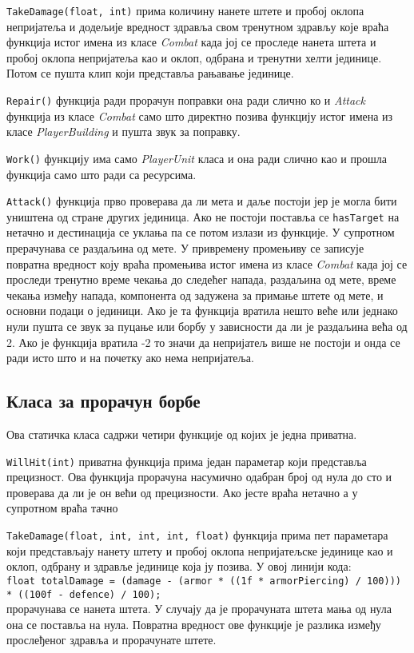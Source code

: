\documentclass[11pt,a4paper]{article}
\begin{document}
\texttt{TakeDamage(float, int)} прима количину нанете штете и пробој оклопа непријатеља и додељије вредност здравља свом тренутном здрављу које враћа функција истог имена из класе \emph{Combat} када јој се проследе нанета штета и пробој оклопа непријатеља као и оклоп, одбрана и тренутни хелти јединице. Потом се пушта клип који представља рањавање јединице.

\texttt{Repair()} функција ради прорачун поправки она ради слично ко и \emph{Attack} функција из класе \emph{Combat} само што директно позива функцију истог имена из класе \emph{PlayerBuilding} и пушта звук за поправку.

\texttt{Work()} функцију има само \emph{PlayerUnit} класа и она ради слично као и прошла функција само што ради са ресурсима.

\texttt{Attack()} функција прво проверава да ли мета и даље постоји јер је могла бити уништена од стране других јединица. Ако не постоји поставља се \texttt{hasTarget} на нетачно и дестинација се уклања па се потом излази из функције. У супротном прерачунава се раздаљина од мете. У привремену промењиву се записује повратна вредност коју враћа промењива истог имена из класе \emph{Combat} када јој се проследи тренутно време чекања до следећег напада, раздаљина од мете, време чекања између напада, компонента од задужена за примање штете од мете, и основни подаци о јединици.  Ако је та функција вратила нешто веће или једнако нули пушта се звук за пуцање или борбу у зависности да ли је раздаљина већа од 2. Ако је функција вратила -2 то значи да непријатељ више не постоји и онда се ради исто што и на почетку ако нема непријатеља.
\newpage
\subsection{Класа за прорачун борбе}
Ова статичка класа садржи четири функције од којих је једна приватна.

\texttt{WillHit(int)} приватна функција прима један параметар који представља прецизност. Ова функција прорачуна насумично одабран број од нула до сто и проверава да ли је он већи од прецизности. Ако јесте враћа нетачно а  у супротном враћа тачно

\texttt{TakeDamage(float, int, int, int, float)} функција прима пет параметара који представљају нанету штету и пробој оклопа непријатељске јединице као и оклоп, одбрану и здравље јединице која ју позива. У овој линији кода:\\ \texttt{float totalDamage = (damage - (armor * ((1f * armorPiercing) / 100))) * ((100f - defence) / 100);} 
\\ прорачунава се нанета штета. У случају да је прорачуната штета мања од нула она се поставља на нула. Повратна вредност ове функције је разлика између прослеђеног здравља и прорачунате штете.
\end{document}
